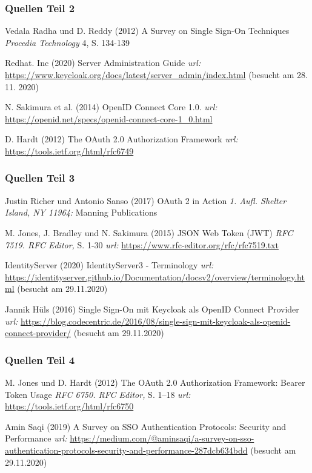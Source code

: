 \documentclass{beamer}
\begin{document}
\begin{frame}
\frametitle{Quellen Teil 2}
\footnotesize{
\begin{thebibliography}{99}
 Vedala Radha und D. Reddy (2012)
\newblock A Survey on Single Sign-On Techniques
\newblock \emph{Procedia Technology} 4, S. 134-139

 Redhat. Inc (2020)
\newblock Server Administration Guide
\newblock \emph{url:} \url{https://www.keycloak.org/docs/latest/server_admin/index.html} (besucht am 28. 11. 2020)

 N. Sakimura et al. (2014)
\newblock OpenID Connect Core 1.0.
\newblock \emph{url:} \url{https://openid.net/specs/openid-connect-core-1_0.html}

 D. Hardt (2012)
\newblock The OAuth 2.0 Authorization Framework
\newblock \emph{url:} \url{https://tools.ietf.org/html/rfc6749}
\end{thebibliography}
}
\end{frame}

\begin{frame}
\frametitle{Quellen Teil 3}
\footnotesize{
\begin{thebibliography}{99}
 Justin Richer und Antonio Sanso (2017)
\newblock OAuth 2 in Action
\newblock \emph{1. Aufl. Shelter Island, NY 11964:} Manning Publications

 M. Jones, J. Bradley und N. Sakimura (2015)
\newblock JSON Web Token (JWT)
\newblock \emph{RFC 7519. RFC Editor,} S. 1-30 \emph{url:} \url{https://www.rfc-editor.org/rfc/rfc7519.txt}

 IdentityServer (2020)
\newblock IdentityServer3 - Terminology
\newblock \emph{url:} \url{https://identityserver.github.io/Documentation/docsv2/overview/terminology.html} (besucht am 29.11.2020)

 Jannik Hüls (2016)
\newblock Single Sign-On mit Keycloak als OpenID Connect Provider
\newblock \emph{url:} \url{https://blog.codecentric.de/2016/08/single-sign-mit-keycloak-als-openid-connect-provider/} (besucht am 29.11.2020)
\end{thebibliography}
}
\end{frame}

\begin{frame}
\frametitle{Quellen Teil 4}
\footnotesize{
\begin{thebibliography}{99}
 M. Jones und D. Hardt (2012)
\newblock The OAuth 2.0 Authorization Framework: Bearer Token Usage
\newblock \emph{RFC 6750. RFC Editor,} S. 1–18 \emph{url:} \url{https://tools.ietf.org/html/rfc6750}

 Amin Saqi (2019)
\newblock A Survey on SSO Authentication Protocols: Security and Performance
\newblock \emph{url:} \url{https://medium.com/@aminsaqi/a-survey-on-sso-authentication-protocols-security-and-performance-287dcb634bdd} (besucht am 29.11.2020)
\end{thebibliography}
}
\end{frame}
\end{document}
